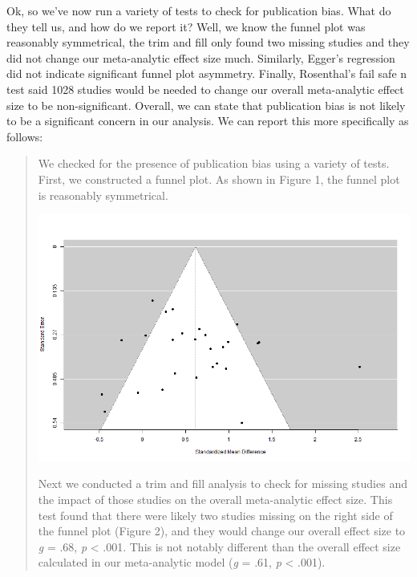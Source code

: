\documentclass[
]{book}
\begin{document}
Ok, so we've now run a variety of tests to check for publication bias. What do they tell us, and how do we report it? Well, we know the funnel plot was reasonably symmetrical, the trim and fill only found two missing studies and they did not change our meta-analytic effect size much. Similarly, Egger's regression did not indicate significant funnel plot asymmetry. Finally, Rosenthal's fail safe n test said 1028 studies would be needed to change our overall meta-analytic effect size to be non-significant. Overall, we can state that publication bias is not likely to be a significant concern in our analysis. We can report this more specifically as follows:

\begin{quote}
We checked for the presence of publication bias using a variety of tests. First, we constructed a funnel plot. As shown in Figure 1, the funnel plot is reasonably symmetrical.

\includegraphics[width=1\textwidth,height=\textheight]{images/clipboard-27399461.png}

Next we conducted a trim and fill analysis to check for missing studies and the impact of those studies on the overall meta-analytic effect size. This test found that there were likely two studies missing on the right side of the funnel plot (Figure 2), and they would change our overall effect size to \emph{g} = .68, \emph{p} \textless{} .001. This is not notably different than the overall effect size calculated in our meta-analytic model (\emph{g} = .61, \emph{p} \textless{} .001).


\end{quote}
\end{document}
